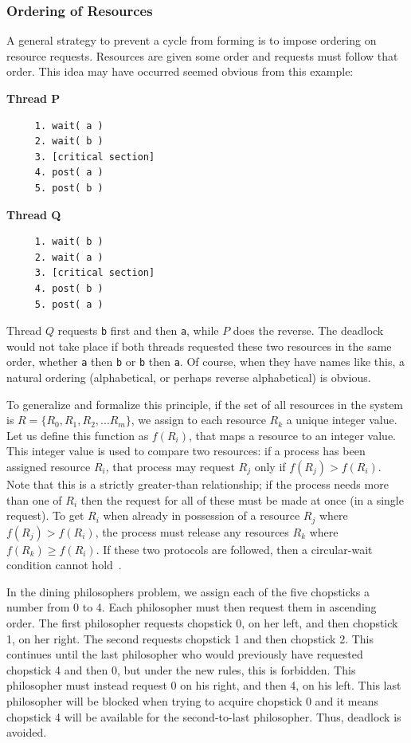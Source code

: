 \documentclass[a4paper]{report}
\begin{document}
\subsubsection*{Ordering of Resources}
A general strategy to prevent a cycle from forming is to impose ordering on resource requests. Resources are given some order and requests must follow that order. This idea may have occurred seemed obvious from this example:

\begin{multicols}{2}
	\textbf{Thread P}\vspace{-2em}
	\begin{verbatim}
	 1. wait( a ) 
	 2. wait( b )
	 3. [critical section]
	 4. post( a )
	 5. post( b )
  \end{verbatim}
	\columnbreak
	\textbf{Thread Q}\vspace{-2em}
	\begin{verbatim}
	 1. wait( b ) 
	 2. wait( a )
	 3. [critical section]
	 4. post( b )
	 5. post( a )
  \end{verbatim}
\end{multicols}
\vspace{-2em}

Thread $Q$ requests \texttt{b} first and then \texttt{a}, while $P$ does the reverse. The deadlock would not take place if both threads requested these two resources in the same order, whether \texttt{a} then \texttt{b} or \texttt{b} then \texttt{a}. Of course, when they have names like this, a natural ordering (alphabetical, or perhaps reverse alphabetical) is obvious.

To generalize and formalize this principle, if the set of all resources in the system is $R = \{R_{0}, R_{1}, R_{2}, ... R_{m}\}$, we assign to each resource $R_{k}$ a unique integer value. Let us define this function as $f(R_{i})$, that maps a resource to an integer value. This integer value is used to compare two resources: if a process has been assigned resource $R_{i}$, that process may request $R_{j}$ only if $f(R_{j}) > f(R_{i})$. Note that this is a strictly greater-than relationship; if the process needs more than one of $R_{i}$ then the request for all of these must be made at once (in a single request). To get $R_{i}$ when already in possession of a resource $R_{j}$ where $f(R_{j}) > f(R_{i})$, the process must release any resources $R_{k}$ where $f(R_{k}) \geq f(R_{i})$. If these two protocols are followed, then a circular-wait condition cannot hold~\cite{osc}.

In the dining philosophers problem, we assign each of the five chopsticks a number from 0 to 4. Each philosopher must then request them in ascending order. The first philosopher requests chopstick 0, on her left, and then chopstick 1, on her right. The second requests chopstick 1 and then chopstick 2. This continues until the last philosopher who would previously have requested chopstick 4 and then 0, but under the new rules, this is forbidden. This philosopher must instead request 0 on his right, and then 4, on his left. This last philosopher will be blocked when trying to acquire chopstick 0 and it means chopstick 4 will be available for the second-to-last philosopher. Thus, deadlock is avoided.
\end{document}
